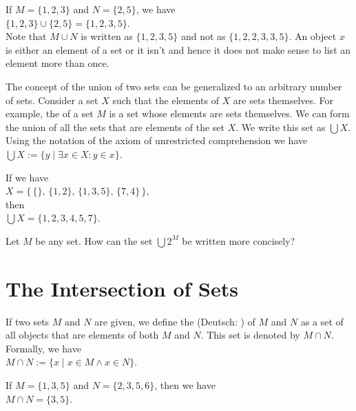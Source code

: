 \exampleEng
If $M = \{1,2,3\}$ and $N = \{2,5\}$, we have 
\\[0.2cm]
\hspace*{1.3cm} 
$\{1,2,3\} \cup \{2,5\} = \{1,2,3,5\}$.  
\\[0.2cm]
Note that $M \cup N$ is written as $\{1,2,3,5\}$  and not as $\{1,2,2,3,3,5\}$.
An object $x$ is either an element of a set or it isn't and hence it does not make sense to list an element
more than once.
\eox
\vspace*{0.2cm}

The concept of the union of two sets can be generalized to an arbitrary number of sets.  Consider
a set $X$ such that the elements of $X$ are sets themselves. For example, the
 of a set $M$ is a set whose elements are sets themselves.  We can form the union of all the 
sets that are elements of the set $X$.  We write this set as $\bigcup X$.  Using the notation of the axiom of
unrestricted comprehension we have
\\[0.2cm]
\hspace*{1.3cm} $\bigcup X := \{ y \;|\; \exists x \in X: y \in x \}$.

\exampleEng
If we have \\[0.2cm]
\hspace*{1.3cm}
 $X = \big\{\, \{\},\, \{1,2\}, \, \{1,3,5\}, \, \{7,4\}\,\big\}$, \\[0.2cm]
then \\[0.2cm] 
\hspace*{1.3cm}
 $\bigcup X = \{ 1, 2, 3, 4, 5, 7 \}$. \eox
\vspace*{0.2cm}

\exerciseEng
Let $M$ be any set.  How can the set $\bigcup 2^M$ be written more concisely?
\eox

\section{The Intersection of Sets}
If two sets $M$ and $N$ are given, we define the  (Deutsch: ) 
 
of $M$ and $N$ as a set of all objects that are
elements of both $M$ and  $N$.  This set is denoted by $M \cap N$.
Formally, we have
\\[0.2cm]
\hspace*{1.3cm} $M \cap N := \{ x \mid x \in M \wedge x \in N \}$.

\exampleEng
If $M = \{ 1, 3, 5 \}$ and $N = \{ 2, 3, 5, 6 \}$, then we have
\\[0.2cm]
\hspace*{1.3cm} $M \cap N = \{ 3, 5 \}$.
\eox
\vspace*{0.2cm}

